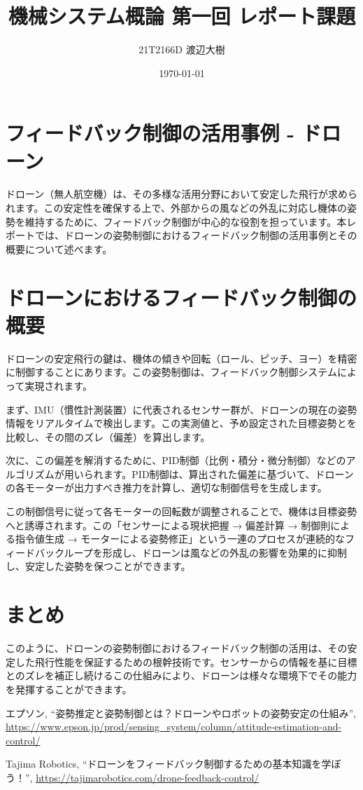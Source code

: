 \documentclass[a4paper,11pt,dvipdfmx]{jsarticle}
\begin{document}

\title{機械システム概論 第一回 レポート課題}
\author{21T2166D 渡辺大樹}
\date{\today}
\maketitle

\section*{フィードバック制御の活用事例 - ドローン}
ドローン（無人航空機）は、その多様な活用分野において安定した飛行が求められます。この安定性を確保する上で、外部からの風などの外乱に対応し機体の姿勢を維持するために、フィードバック制御が中心的な役割を担っています。本レポートでは、ドローンの姿勢制御におけるフィードバック制御の活用事例とその概要について述べます。

\section*{ドローンにおけるフィードバック制御の概要}
ドローンの安定飛行の鍵は、機体の傾きや回転（ロール、ピッチ、ヨー）を精密に制御することにあります。この姿勢制御は、フィードバック制御システムによって実現されます。

まず、IMU（慣性計測装置）に代表されるセンサー群が、ドローンの現在の姿勢情報をリアルタイムで検出します\cite{epson}。この実測値と、予め設定された目標姿勢とを比較し、その間のズレ（偏差）を算出します。

次に、この偏差を解消するために、PID制御（比例・積分・微分制御）などのアルゴリズムが用いられます。PID制御は、算出された偏差に基づいて、ドローンの各モーターが出力すべき推力を計算し、適切な制御信号を生成します\cite{tajima}。

この制御信号に従って各モーターの回転数が調整されることで、機体は目標姿勢へと誘導されます。この「センサーによる現状把握 → 偏差計算 → 制御則による指令値生成 → モーターによる姿勢修正」という一連のプロセスが連続的なフィードバックループを形成し、ドローンは風などの外乱の影響を効果的に抑制し、安定した姿勢を保つことができます。

\section*{まとめ}
このように、ドローンの姿勢制御におけるフィードバック制御の活用は、その安定した飛行性能を保証するための根幹技術です。センサーからの情報を基に目標とのズレを補正し続けるこの仕組みにより、ドローンは様々な環境下でその能力を発揮することができます。

\begin{thebibliography}{9}
エプソン, ``姿勢推定と姿勢制御とは？ドローンやロボットの姿勢安定の仕組み'', \url{https://www.epson.jp/prod/sensing_system/column/attitude-estimation-and-control/}

Tajima Robotics, ``ドローンをフィードバック制御するための基本知識を学ぼう！'', \url{https://tajimarobotics.com/drone-feedback-control/}
\end{thebibliography}
\end{document}

